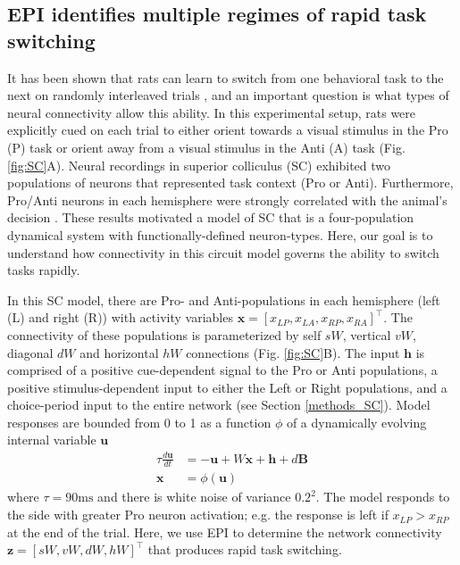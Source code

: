 \documentclass[11pt]{article}
\begin{document}
\subsection{EPI identifies multiple regimes of rapid task switching} \label{results_SC}
It has been shown that rats can learn to switch from one behavioral task to the next on randomly interleaved trials \cite{duan2015requirement}, and an important question is what types of neural connectivity allow this ability.
In this experimental setup, rats were explicitly cued on each trial to either orient towards a visual stimulus in the Pro (P) task or orient away from a visual stimulus in the Anti (A) task (Fig. \ref{fig:SC}A). 
Neural recordings in superior colliculus (SC) exhibited two populations of neurons that represented task context (Pro or Anti).
Furthermore, Pro/Anti neurons in each hemisphere were strongly correlated with the animal's decision \cite{duan2018collicular}.
These results motivated a model of SC that is a four-population dynamical system with functionally-defined neuron-types.
Here, our goal is to understand how connectivity in this circuit model governs the ability to switch tasks rapidly.

In this SC model, there are Pro- and Anti-populations in each hemisphere (left (L) and right (R)) with activity variables $\mathbf{x} = [x_{LP}, x_{LA}, x_{RP}, x_{RA}]^\top$.
The connectivity of these populations is parameterized by self $sW$, vertical $vW$, diagonal $dW$ and horizontal $hW$ connections (Fig. \ref{fig:SC}B).
The input $\mathbf{h}$ is comprised of a positive cue-dependent signal to the Pro or Anti populations, a positive stimulus-dependent input to either the Left or Right populations, and a choice-period input to the entire network (see Section \ref{methods_SC}).
Model responses are bounded from 0 to 1 as a function $\phi$ of a dynamically evolving internal variable $\mathbf{u}$
\begin{equation}
\begin{split}
\tau \frac{d\mathbf{u}}{dt} &= -\mathbf{u} + W\mathbf{x} + \mathbf{h} + d\mathbf{B} \\
\mathbf{x} &= \phi(\mathbf{u})
\end{split}
\end{equation}
where $\tau= 90\text{ms}$ and there is white noise of variance $0.2^2$.
The model responds to the side with greater Pro neuron activation; e.g. the response is left if $x_{LP} > x_{RP}$ at the end of the trial.  
Here, we use EPI to determine the network connectivity $\mathbf{z} = [sW, vW, dW, hW]^{\top}$ that produces rapid task switching.
\end{document}
